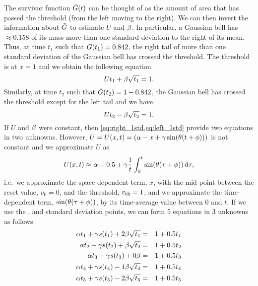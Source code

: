 The survivor function ${ \bar{G} }(t)$ can be thought of as the amount of area that has
passed the threshold (from the left moving to the right). We can then invert the
information about ${ \bar{G} }$ to estimate $U$ and $\beta$. In particular, a Gaussian bell
has $\approx 0.158$ of its mass more than one standard deviation to the right of
its mean. Thus, at time $t_1$ such that ${ \bar{G} }(t_1) = 0.842$, the right tail of
more than one standard deviation of the Gaussian bell has crossed the threshold.
The threshold is at $x = 1$ and we obtain the following equation
\begin{equation}
U t_1 + \beta \sqrt{t_1} = 1.
\label{eq:right_1std}
\end{equation}
Similarly, at time $t_2$ such that ${ \bar{G} }(t_2) = 1 - 0.842$, the Gaussian bell has
crossed the threshold except for the left tail and we have
\begin{equation}
U t_2 - \beta \sqrt{t_2} = 1.
\label{eq:left_1std}
\end{equation}
If $U$ and $\beta$ were constant, then \cref{eq:right_1std,eq:left_1std} provide
two equations in two unknowns.
However, $U = U(x,t) = (\alpha - x + {\gamma } \sin({ \theta} (t + \phi)) )$ is not constant and
we approximate $U$ as
\begin{equation}
U(x,t ) \approx \alpha -0.5 + {\gamma } \frac{1}{t}\int_0^t \sin({ \theta} ({\tau}+\phi)) \, \mathrm{d} {\tau}, 
\end{equation}
i.e.\ we approximate the space-dependent term, $x$, with the mid-point between
the reset value, $v_0 = 0$, and the threshold, ${ v_{\textrm{th} } } = 1$, and we approximate
the time-dependent term, $\sin({ \theta} ({\tau}+\phi))$, by its time-average value
between $0$ and $t$. If we use the ,  and  standard 
deviation points, we can form 5 equations in 3 unknowns as follows
\begin{eqnarray*}
\alpha t_1 + {\gamma } s(t_1) + 2\beta \sqrt{t_1}
&=& 1 + 0.5 t_1
\\
\alpha t_2 + {\gamma } s(t_2) + \beta \sqrt{t_2}
&=& 1 + 0.5 t_2 
\\
\alpha t_3 + {\gamma } s(t_3) + 0\beta
&=& 1 + 0.5 t_3
\\
\alpha t_4 + {\gamma } s(t_4)-1 \beta \sqrt{t_4}
&=& 1 + 0.5 t_4 
\\
\alpha t_5 + {\gamma } s(t_5) - 2\beta \sqrt{t_5}
&=& 1 + 0.5 t_5 
\end{eqnarray*}
